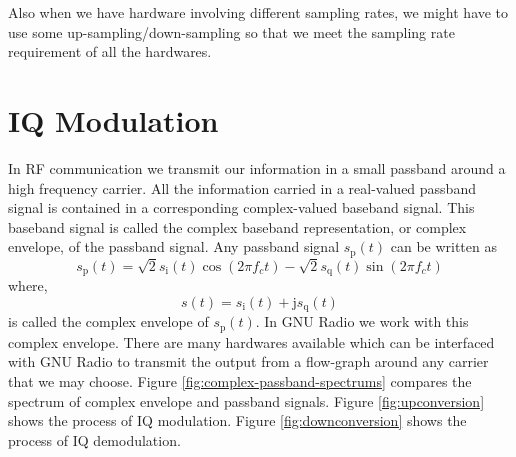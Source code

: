 \documentclass[a4paper,10pt]{article}
\begin{document}
Also when we have hardware involving different sampling rates, we might have to use some up-sampling/down-sampling
so that we meet the sampling rate requirement of all the hardwares.

\section{IQ Modulation\cite{bib:madhov}}
In RF communication we transmit our information in a small passband around a high frequency carrier.
All the information carried in a real-valued passband signal is contained in a corresponding complex-valued baseband signal. 
This baseband signal is called the complex baseband representation, or complex envelope, of the passband signal.
Any passband signal $s_{\text{p}}(t)$ can be written as
\begin{equation}
 s_{\text{p}}(t) = \sqrt{2}s_{\text{i}}(t)\operatorname{cos}(2\pi f_ct) - \sqrt{2}s_{\text{q}}(t)\operatorname{sin}(2\pi f_ct)
\end{equation}
where,
\begin{equation}
 s(t) = s_{\text{i}}(t) + \text{j}s_{\text{q}}(t)
\end{equation}
is called the complex envelope of $s_{\text{p}}(t)$. In GNU Radio we work with this complex envelope.
There are many hardwares available which can be interfaced with GNU Radio to transmit the output from a flow-graph
around any carrier that we may choose. Figure \ref{fig:complex-passband-spectrums} compares the spectrum of 
complex envelope and passband signals. Figure \ref{fig:upconversion} shows the process of IQ modulation.
Figure \ref{fig:downconversion} shows the process of IQ demodulation.
\end{document}
